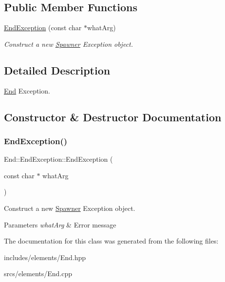 \subsection*{Public Member Functions}
\begin{DoxyCompactItemize}
\item 
\hyperlink{class_end_1_1_end_exception_af8faffab84c954ec222ee41f9be72cf3}{End\+Exception} (const char $\ast$what\+Arg)
\begin{DoxyCompactList}\small\item\em Construct a new \hyperlink{class_spawner}{Spawner} Exception object. \end{DoxyCompactList}\end{DoxyCompactItemize}


\subsection{Detailed Description}
\hyperlink{class_end}{End} Exception. 

\subsection{Constructor \& Destructor Documentation}
\mbox{\label{class_end_1_1_end_exception_af8faffab84c954ec222ee41f9be72cf3}} 
\subsubsection{\texorpdfstring{End\+Exception()}{EndException()}}
{\footnotesize\ttfamily End\+::\+End\+Exception\+::\+End\+Exception (\begin{DoxyParamCaption}\item[{const char $\ast$}]{what\+Arg }\end{DoxyParamCaption})\hspace{0.3cm}{\ttfamily [explicit]}}



Construct a new \hyperlink{class_spawner}{Spawner} Exception object. 


\begin{DoxyParams}{Parameters}
{\em what\+Arg} & Error message \\
\hline
\end{DoxyParams}


The documentation for this class was generated from the following files\+:\begin{DoxyCompactItemize}
\item 
includes/elements/End.\+hpp\item 
srcs/elements/End.\+cpp\end{DoxyCompactItemize}
